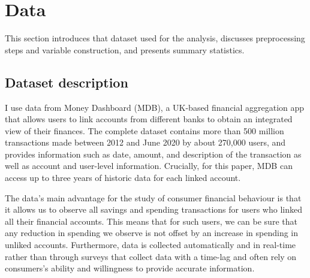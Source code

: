 
\section{Data}%
\label{sec:data}

This section introduces that dataset used for the analysis, discusses
preprocessing steps and variable construction, and presents summary statistics.




\subsection{Dataset description}%
\label{sub:dataset_description}

I use data from Money Dashboard (MDB), a UK-based financial aggregation app that
allows users to link accounts from different banks to obtain an integrated view
of their finances. The complete dataset contains more than 500 million
transactions made between 2012 and June 2020 by about 270,000 users, and
provides information such as date, amount, and description of the transaction
as well as account and user-level information. Crucially, for this paper, MDB
can access up to three years of historic data for each linked account.

The data's main advantage for the study of consumer financial behaviour is that
it allows us to observe all savings and spending transactions for users who
linked all their financial accounts. This means that for such users, we can be
sure that any reduction in spending we observe is not offset by an increase in
spending in unliked accounts. Furthermore, data is collected automatically and
in real-time rather than through surveys that collect data with a time-lag and
often rely on consumers's ability and willingness to provide accurate
information.

